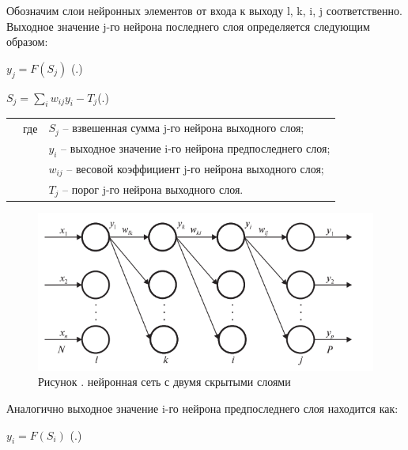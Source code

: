 {	\par \redline Обозначим слои нейронных элементов от входа к выходу l, k, i, j соответственно. Выходное значение j-го нейрона последнего слоя определяется следующим образом:
	
	\formulaspace \par \redline 
	$y_{j} = F(S_{j}) $
	\hfill (\thechaptercntr .\theformulacntr) \redline
	\formulaspace \addtocounter{formulacntr}{1}
	
	\formulaspace \par \redline 
	$S_{j} = \sum \limits _{i}^{} w_{ij}y_{i} - T_{j}$\hfill (\thechaptercntr .\theformulacntr) \redline
	\formulaspace \addtocounter{formulacntr}{1}
	
	\begin{tabular}{p{}p{}p{}}
		& где  & $S_{j}$ {--} взвешенная сумма j-го нейрона выходного слоя; \\
		&      & $y_{i}$ {--} выходное значение i-го нейрона предпоследнего слоя; \\
		&      & $w_{ij}$ {--} весовой коэффициент j-го нейрона выходного слоя; \\
		&      & $T_{j}$ {--} порог j-го нейрона выходного слоя. \\
	\end{tabular}
	
	\begin{figure}[H]
		\centering
		\def\svgwidth{\textwidth}
		\includegraphics[scale=1.2]{images/bpe_perceptron.png}
		\caption*{\gostFont Рисунок \thechaptercntr .\theimagecntr \spc {--} нейронная сеть с двумя скрытыми слоями}
	\end{figure}  \addtocounter{imagecntr}{1}
	
	
	\par \redline Аналогично выходное значение i-го нейрона предпоследнего слоя находится как:
	
		\formulaspace \par \redline 
	$y_{i} = F(S_{i}) $
	\hfill (\thechaptercntr .\theformulacntr) \redline
	\formulaspace \addtocounter{formulacntr}{1}
	
}
